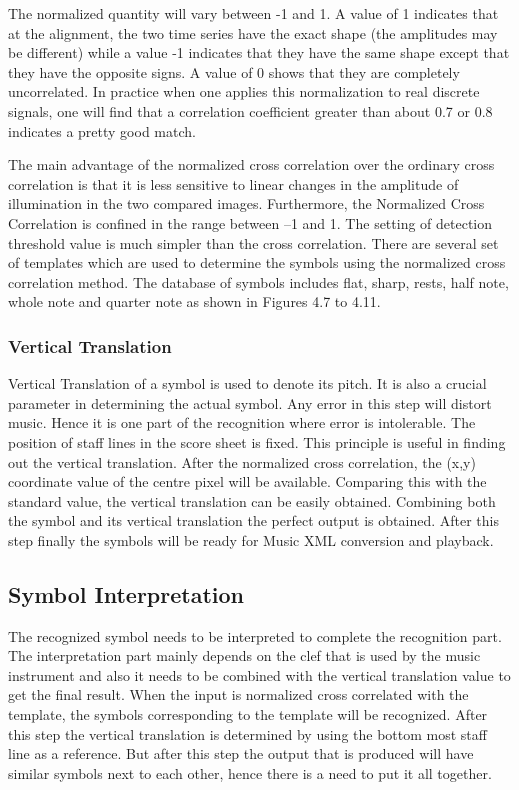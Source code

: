 \documentclass[journal]{IEEEtran}
\begin{document}
The normalized quantity will vary between -1 and 1. A value of 1 indicates that at the alignment, the two time series have the exact shape (the amplitudes may be different) while a value -1 indicates that they have the same shape except that they have the opposite signs. A value of 0 shows that they are completely uncorrelated. In practice when one applies this normalization to real discrete signals, one will find that a correlation coefficient greater than about 0.7 or 0.8 indicates a pretty good match. \par

The main advantage of the normalized cross correlation over the ordinary cross correlation is that it is less sensitive to linear changes in the amplitude of illumination in the two compared images. Furthermore, the Normalized Cross Correlation is confined in the range between –1 and 1. The setting of detection threshold value is much simpler than the cross correlation. There are several set of templates which are used to determine the symbols using the normalized
cross correlation method. The database of symbols includes flat, sharp, rests, half note, whole note and quarter note as shown in Figures 4.7 to 4.11.

\subsubsection{Vertical Translation}
Vertical Translation of a symbol is used to denote its pitch. It is also a crucial parameter in determining the actual symbol. Any error in this step will distort music. Hence it is one part of the recognition where error is intolerable. The position of staff lines in the score sheet is fixed. This principle is useful in finding out the vertical translation. After the normalized cross correlation, the (x,y) coordinate value of the centre pixel will be available. Comparing this with the standard value, the vertical translation can be easily obtained. Combining both the symbol and its vertical translation the perfect output is obtained. After this step finally the symbols will be ready for Music
XML conversion and playback.

\subsection{Symbol Interpretation}
The recognized symbol needs to be interpreted to complete the recognition part. The interpretation part mainly depends on the clef that is used by the music instrument and also it needs to be combined with the vertical translation value to get the final result. When the input is normalized cross correlated with the template, the symbols corresponding to the template will be recognized. After
this step the vertical translation is determined by using the bottom most staff line as a reference. But after this step the output that is produced will have similar symbols next to each other, hence there is a need to put it all together.
\end{document}
